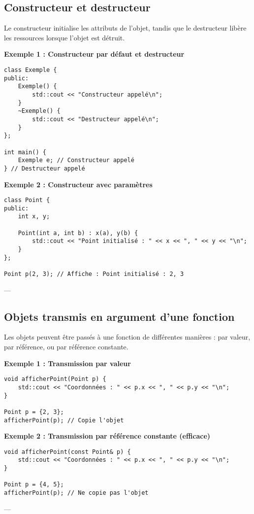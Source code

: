 \subsection{ Constructeur et destructeur}
Le constructeur initialise les attributs de l’objet, tandis que le destructeur libère les ressources lorsque l’objet est détruit.

\textbf{Exemple 1 : Constructeur par défaut et destructeur}
\begin{tcolorbox}[colframe=blue!50!black, colback=blue!5!white, title=Exemple d'Attributs et Méthodes Statistiques, float=htb]
\begin{verbatim}
class Exemple {
public:
    Exemple() {
        std::cout << "Constructeur appelé\n";
    }
    ~Exemple() {
        std::cout << "Destructeur appelé\n";
    }
};

int main() {
    Exemple e; // Constructeur appelé
} // Destructeur appelé
\end{verbatim}
\end{tcolorbox}
\textbf{Exemple 2 : Constructeur avec paramètres}
\begin{tcolorbox}[colframe=blue!50!black, colback=blue!5!white, title=Exemple d'Attributs et Méthodes Statistiques, float=htb]
\begin{verbatim}
class Point {
public:
    int x, y;

    Point(int a, int b) : x(a), y(b) {
        std::cout << "Point initialisé : " << x << ", " << y << "\n";
    }
};

Point p(2, 3); // Affiche : Point initialisé : 2, 3
\end{verbatim}
\end{tcolorbox}
---

\subsection{ Objets transmis en argument d'une fonction}
Les objets peuvent être passés à une fonction de différentes manières : par valeur, par référence, ou par référence constante.

\textbf{Exemple 1 : Transmission par valeur}
\begin{tcolorbox}[colframe=blue!50!black, colback=blue!5!white, title=Exemple d'Attributs et Méthodes Statistiques, float=htb]
\begin{verbatim}
void afficherPoint(Point p) {
    std::cout << "Coordonnées : " << p.x << ", " << p.y << "\n";
}

Point p = {2, 3};
afficherPoint(p); // Copie l'objet
\end{verbatim}
\end{tcolorbox}
\textbf{Exemple 2 : Transmission par référence constante (efficace)}
\begin{tcolorbox}[colframe=blue!50!black, colback=blue!5!white, title=Exemple d'Attributs et Méthodes Statistiques, float=htb]
\begin{verbatim}
void afficherPoint(const Point& p) {
    std::cout << "Coordonnées : " << p.x << ", " << p.y << "\n";
}

Point p = {4, 5};
afficherPoint(p); // Ne copie pas l'objet
\end{verbatim}
\end{tcolorbox}
---

